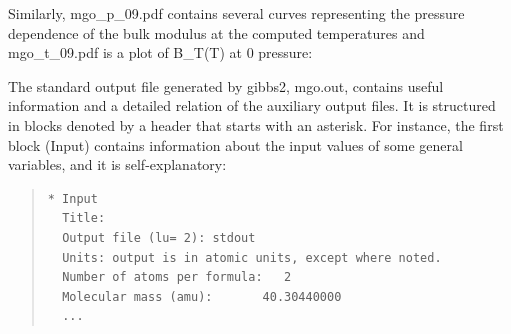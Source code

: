 \documentclass[a4paper]{article}
\begin{document}
Similarly, mgo\_p\_09.pdf contains several curves representing the
pressure dependence of the bulk modulus at the computed temperatures
and mgo\_t\_09.pdf is a plot of B\_T(T) at 0 pressure:

\noindent{}

\noindent{}

The standard output file generated by gibbs2, mgo.out, contains useful
information and a detailed relation of the auxiliary output files. It
is structured in blocks denoted by a header that starts with an
asterisk. For instance, the first block (Input) contains information
about the input values of some general variables, and it is
self-explanatory:
%
\begin{quote}
\begin{verbatim}
* Input
  Title:
  Output file (lu= 2): stdout
  Units: output is in atomic units, except where noted.
  Number of atoms per formula:   2
  Molecular mass (amu):       40.30440000
  ...
\end{verbatim}
\end{quote}
\end{document}
